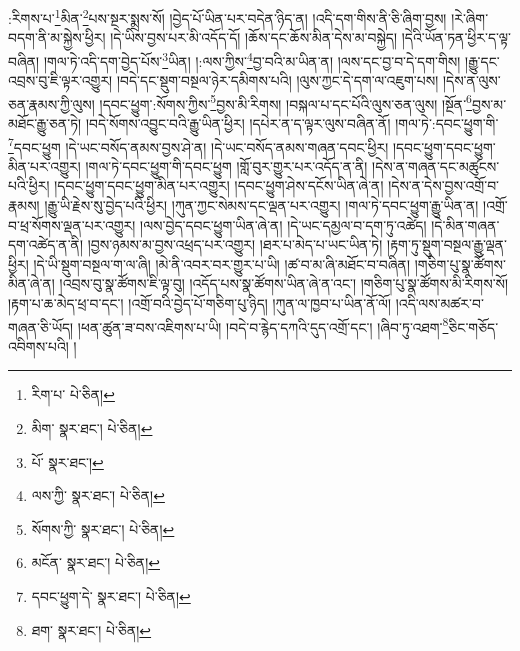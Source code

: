 :རིགས་པ་\footnote{རིག་པ་  པེ་ཅིན། }མིན་\footnote{མིག་  སྣར་ཐང་།  པེ་ཅིན། }པས་སྔར་སྨྲས་སོ། །བྱེད་པོ་ཡིན་པར་བདེན་ཉིད་ན། །འདི་དག་གིས་ནི་ཅི་ཞིག་བྱས། །རེ་ཞིག་བདག་ནི་མ་སྐྱེས་ཕྱིར། །དེ་ཡིས་བྱས་པར་མི་འདོད་དོ། །ཆོས་དང་ཆོས་མིན་དེས་མ་བསྐྱེད། །དེའི་ཡོན་ཏན་ཕྱིར་ད་ལྟ་བཞིན། །གལ་ཏེ་འདི་དག་བྱེད་པོས་\footnote{པོ་  སྣར་ཐང་། }ཡིན། །:ལས་ཀྱིས་\footnote{ལས་ཀྱི་  སྣར་ཐང་།  པེ་ཅིན། }བྱ་བའི་མ་ཡིན་ན། །ལས་དང་བྱ་བ་དེ་དག་གིས། །རྒྱུ་དང་འབྲས་བུ་ཇི་ལྟར་འགྱུར། །བདེ་དང་སྡུག་བསྔལ་ཉེར་དམིགས་པའི། །ལུས་ཀྱང་དེ་དག་ལ་འཇུག་པས། །དེས་ན་ལུས་ཅན་རྣམས་ཀྱི་ལུས། །དབང་ཕྱུག་:སོགས་ཀྱིས་\footnote{སོགས་ཀྱི་  སྣར་ཐང་།  པེ་ཅིན། }བྱས་མི་རིགས། །བསྐལ་པ་དང་པོའི་ལུས་ཅན་ལུས། །སྔོན་\footnote{མངོན་  སྣར་ཐང་།  པེ་ཅིན། }བྱས་མ་མཐོང་རྒྱུ་ཅན་ཏེ། །བདེ་སོགས་འབྱུང་བའི་རྒྱུ་ཡིན་ཕྱིར། །དཔེར་ན་ད་ལྟར་ལུས་བཞིན་ནོ། །གལ་ཏེ་:དབང་ཕྱུག་གི་\footnote{དབང་ཕྱུག་དེ་  སྣར་ཐང་།  པེ་ཅིན། }དབང་ཕྱུག །དེ་ཡང་བསོད་ནམས་བྱས་ཤེ་ན། །དེ་ཡང་བསོད་ནམས་གཞན་དབང་ཕྱིར། །དབང་ཕྱུག་དབང་ཕྱུག་མིན་པར་འགྱུར། །གལ་ཏེ་དབང་ཕྱུག་གི་དབང་ཕྱུག །གློ་བུར་གྱུར་པར་འདོད་ན་ནི། །དེས་ན་གཞན་དང་མཚུངས་པའི་ཕྱིར། །དབང་ཕྱུག་དབང་ཕྱུག་མིན་པར་འགྱུར། །དབང་ཕྱུག་ཤེས་དངོས་ཡིན་ཞེ་ན། །དེས་ན་དེས་བྱས་འགྲོ་བ་རྣམས། །རྒྱུ་ཡི་རྗེས་སུ་བྱེད་པའི་ཕྱིར། །ཀུན་ཀྱང་སེམས་དང་ལྡན་པར་འགྱུར། །གལ་ཏེ་དབང་ཕྱུག་རྒྱུ་ཡིན་ན། །འགྲོ་བ་ཕྲ་སོགས་ལྡན་པར་འགྱུར། །ལས་བྱེད་དབང་ཕྱུག་ཡིན་ཞེ་ན། །དེ་ཡང་དམྱལ་བ་དག་ཏུ་འཚེད། །དེ་མིན་གཞན་དག་འཚེད་ན་ནི། །བྱས་ཉམས་མ་བྱས་འཕྲད་པར་འགྱུར། །ཐར་པ་མེད་པ་ཡང་ཡིན་ཏེ། །རྟག་ཏུ་སྡུག་བསྔལ་རྒྱུ་ལྡན་ཕྱིར། །དེ་ཡི་སྡུག་བསྔལ་ག་ལ་ཞི། །མེ་ནི་འབར་བར་གྱུར་པ་ཡི། །ཚ་བ་མ་ཞི་མཐོང་བ་བཞིན། །གཅིག་པུ་སྣ་ཚོགས་མིན་ཞེ་ན། །འབྲས་བུ་སྣ་ཚོགས་ཇི་ལྟ་བུ། །འདོད་པས་སྣ་ཚོགས་ཡིན་ཞེ་ན་འང་། །གཅིག་པུ་སྣ་ཚོགས་མི་རིགས་སོ། །རྟག་པ་ཆ་མེད་ཕྲ་བ་དང་། །འགྲོ་བའི་བྱེད་པོ་གཅིག་པུ་ཉིད། །ཀུན་ལ་ཁྱབ་པ་ཡིན་ནོ་ལོ། །འདི་ལས་མཚར་བ་གཞན་ཅི་ཡོད། །ཕན་ཚུན་ཟ་བས་འཇིགས་པ་ཡི། །བདེ་བ་རྙེད་དཀའི་དུད་འགྲོ་དང་། །ཞིབ་ཏུ་འཐག་\footnote{ཐག་  སྣར་ཐང་།  པེ་ཅིན། }ཅིང་གཅོད་འབིགས་པའི། །
